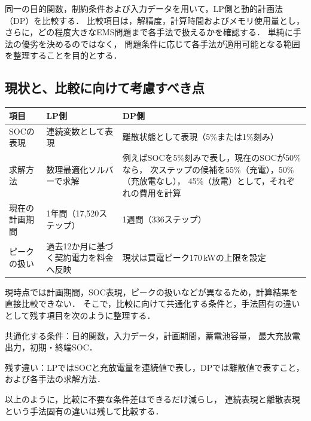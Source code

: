 \documentclass[a4paper,11pt,dvipdfmx]{jsarticle}
\newcommand{\term}[1]{#1}
\begin{document}
同一の目的関数，制約条件および入力データを用いて，LP側と動的計画法（DP）を比較する．
比較項目は，\term{解精度}，\term{計算時間}および\term{メモリ使用量}とし，
さらに，どの程度大きなEMS問題まで各手法で扱えるかを確認する．
単純に手法の優劣を決めるのではなく，
問題条件に応じて各手法が適用可能となる範囲を整理することを目的とする．

\subsection{現状と、比較に向けて考慮すべき点}

\begin{center}
  \begin{tabular}{p{30mm}p{62mm}p{62mm}}
    \toprule
    項目 & LP側                            & DP側 \\
    \midrule
    SOCの表現
       & 連続変数として表現
       & 離散状態として表現（5\%または1\%刻み）               \\
    求解方法
       & 数理最適化ソルバーで求解
       & 例えばSOCを5\%刻みで表し，現在のSOCが50\%なら，
    次ステップの候補を55\%（充電），50\%（充放電なし），
    45\%（放電）として，それぞれの費用を計算                    \\
    現在の計画期間
       & 1年間（17,520ステップ）
       & 1週間（336ステップ）                         \\
    ピークの扱い
       & 過去12か月に基づく契約電力を料金へ反映
       & 現状は買電ピーク170\,kWの上限を設定                \\
    \bottomrule
  \end{tabular}
\end{center}

現時点では計画期間，SOC表現，ピークの扱いなどが異なるため，計算結果を直接比較できない．
そこで，比較に向けて共通化する条件と，手法固有の違いとして残す項目を次のように整理する．

共通化する条件：目的関数，入力データ，計画期間，蓄電池容量，
最大充放電出力，初期・終端SOC．

残す違い：LPではSOCと充放電量を連続値で表し，DPでは離散値で表すこと，
および各手法の求解方法．

以上のように，比較に不要な条件差はできるだけ減らし，
連続表現と離散表現という手法固有の違いは残して比較する．
\end{document}
